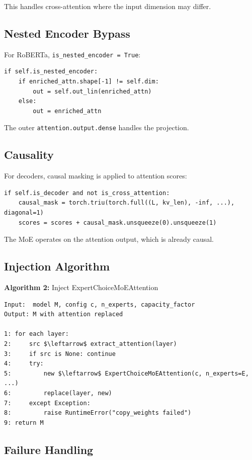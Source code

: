 This handles cross-attention where the input dimension may differ.

\subsection{Nested Encoder Bypass}

For RoBERTa, \texttt{is\_nested\_encoder = True}:

\begin{lstlisting}
if self.is_nested_encoder:
    if enriched_attn.shape[-1] != self.dim:
        out = self.out_lin(enriched_attn)
    else:
        out = enriched_attn
\end{lstlisting}

The outer \texttt{attention.output.dense} handles the projection.

\subsection{Causality}

For decoders, causal masking is applied to attention scores:

\begin{lstlisting}
if self.is_decoder and not is_cross_attention:
    causal_mask = torch.triu(torch.full((L, kv_len), -inf, ...), diagonal=1)
    scores = scores + causal_mask.unsqueeze(0).unsqueeze(1)
\end{lstlisting}

The MoE operates on the attention output, which is already causal.

\subsection{Injection Algorithm}

\textbf{Algorithm 2:} Inject ExpertChoiceMoEAttention
\begin{lstlisting}
Input:  model M, config c, n_experts, capacity_factor
Output: M with attention replaced

1: for each layer:
2:     src $\leftarrow$ extract_attention(layer)
3:     if src is None: continue
4:     try:
5:         new $\leftarrow$ ExpertChoiceMoEAttention(c, n_experts=E, ...)
6:         replace(layer, new)
7:     except Exception:
8:         raise RuntimeError("copy_weights failed")
9: return M
\end{lstlisting}

\subsection{Failure Handling}

